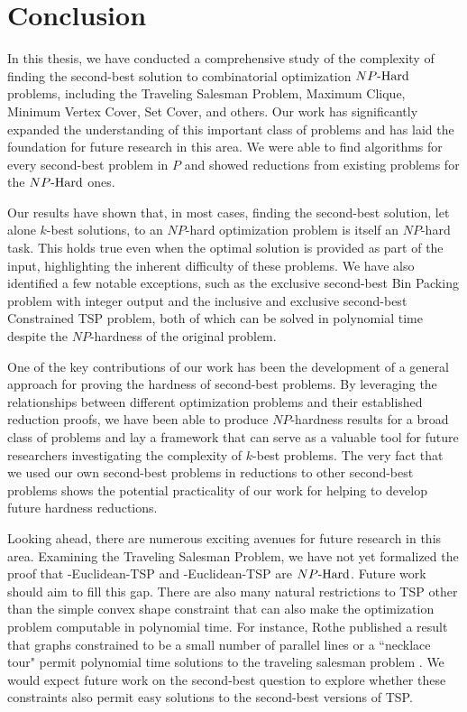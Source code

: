 \chapter{Conclusion}
In this thesis, we have conducted a comprehensive study of the complexity of finding the second-best solution to combinatorial optimization ${NP\text{-Hard{}}}$ problems, including the Traveling Salesman Problem, Maximum Clique, Minimum Vertex Cover, Set Cover, and others. Our work has significantly expanded the understanding of this important class of problems and has laid the foundation for future research in this area. We were able to find algorithms for every second-best problem in $P$ and showed reductions from existing problems for the ${NP\text{-Hard{}}}$ ones.

Our results have shown that, in most cases, finding the second-best solution, let alone $k$-best solutions, to an $NP$-hard optimization problem is itself an $NP$-hard task. This holds true even when the optimal solution is provided as part of the input, highlighting the inherent difficulty of these problems. We have also identified a few notable exceptions, such as the exclusive second-best Bin Packing problem with integer output and the inclusive and exclusive second-best Constrained TSP problem, both of which can be solved in polynomial time despite the $NP$-hardness of the original problem.

One of the key contributions of our work has been the development of a general approach for proving the hardness of second-best problems. By leveraging the relationships between different optimization problems and their established reduction proofs, we have been able to produce $NP$-hardness results for a broad class of problems and lay a framework that can serve as a valuable tool for future researchers investigating the complexity of $k$-best problems. The very fact that we used our own second-best problems in reductions to other second-best problems shows the potential practicality of our work for helping to develop future hardness reductions.

Looking ahead, there are numerous exciting avenues for future research in this area. Examining the Traveling Salesman Problem,  we have not yet formalized the proof that \exob{}-Euclidean-TSP and \inob{}-Euclidean-TSP are ${NP\text{-Hard{}}}$. Future work should aim to fill this gap. There are also many natural restrictions to TSP other than the simple convex shape constraint that can also make the optimization problem computable in polynomial time. For instance, Rothe published a result that graphs constrained to be a small number of parallel lines or a ``necklace tour" permit polynomial time solutions to the traveling salesman problem \cite{rothe1988two}. We would expect future work on the second-best question to explore whether these constraints also permit easy solutions to the second-best versions of TSP.


